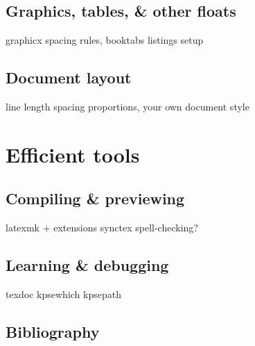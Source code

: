 \documentclass[a4paper,twoside,nofonts]{tufte-handout}
\begin{document}
\subsection{Graphics, tables, \& other floats} %
\label{sec:graphics}

\cite{tufte}

\begin{todoenv}
    graphicx
    spacing
    rules, booktabs
    listings setup
\end{todoenv}

\subsection{Document layout} %
\label{sec:layout}

\cite{bringhurst,designingbooks}

\begin{todoenv}
    line length
    spacing
    proportions, your own document style
\end{todoenv}



\clearpage
\section{Efficient tools} %
\label{sec:tools}

\subsection{Compiling \& previewing} %
\label{sec:compiling}

\begin{todoenv}
    latexmk + extensions
    synctex
    spell-checking?
\end{todoenv}

\subsection{Learning \& debugging} %
\label{sec:learning}

\begin{todoenv}
  texdoc
  kpsewhich
  kpsepath
\end{todoenv}

\subsection{Bibliography} %
\label{sec:bibliography}
\end{document}
